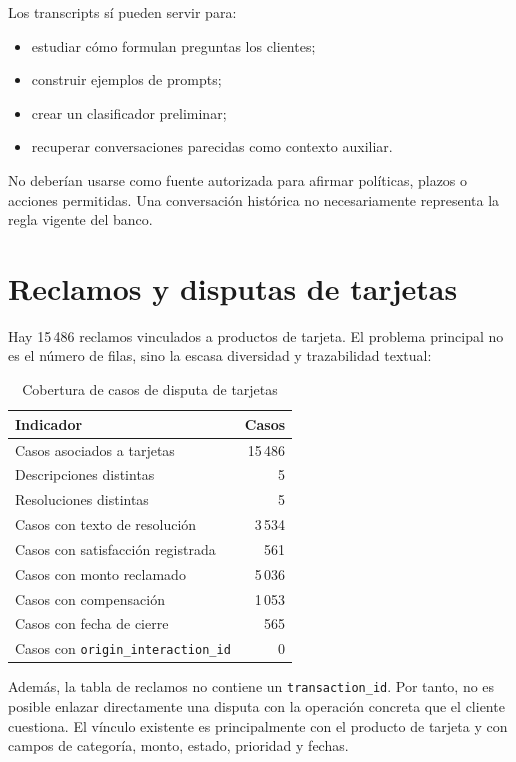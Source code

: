 \documentclass[11pt,a4paper]{article}
\begin{document}
Los transcripts sí pueden servir para:

\begin{itemize}
  \item estudiar cómo formulan preguntas los clientes;
  \item construir ejemplos de prompts;
  \item crear un clasificador preliminar;
  \item recuperar conversaciones parecidas como contexto auxiliar.
\end{itemize}

No deberían usarse como fuente autorizada para afirmar políticas, plazos o acciones permitidas. Una conversación histórica no necesariamente representa la regla vigente del banco.

\section{Reclamos y disputas de tarjetas}

Hay 15\,486 reclamos vinculados a productos de tarjeta. El problema principal no es el número de filas, sino la escasa diversidad y trazabilidad textual:

\begin{table}[ht]
\centering
\caption{Cobertura de casos de disputa de tarjetas}
\begin{tabularx}{\textwidth}{>{\raggedright\arraybackslash}p{} r}
\toprule
Indicador & Casos \\
\midrule
Casos asociados a tarjetas & 15\,486 \\
Descripciones distintas & 5 \\
Resoluciones distintas & 5 \\
Casos con texto de resolución & 3\,534 \\
Casos con satisfacción registrada & 561 \\
Casos con monto reclamado & 5\,036 \\
Casos con compensación & 1\,053 \\
Casos con fecha de cierre & 565 \\
Casos con \texttt{origin\_interaction\_id} & 0 \\
\bottomrule
\end{tabularx}
\end{table}

Además, la tabla de reclamos no contiene un \texttt{transaction\_id}. Por tanto, no es posible enlazar directamente una disputa con la operación concreta que el cliente cuestiona. El vínculo existente es principalmente con el producto de tarjeta y con campos de categoría, monto, estado, prioridad y fechas.
\end{document}
